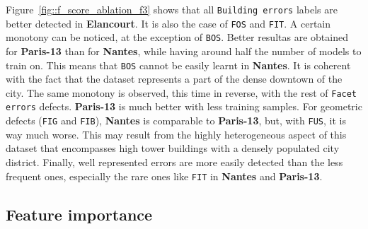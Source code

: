         Figure~\ref{fig::f_score_ablation_f3} shows that all \texttt{Building errors} labels are better detected in \textbf{Elancourt}.
        It is also the case of \texttt{FOS} and \texttt{FIT}.
        A certain monotony can be noticed, at the exception of \texttt{BOS}.
        Better resultas are obtained for \textbf{Paris-13} than for \textbf{Nantes}, while having around half the number of models to train on.
        This means that \texttt{BOS} cannot be easily learnt in \textbf{Nantes}.
        It is coherent with the fact that the dataset represents a part of the dense downtown of the city.
        The same monotony is observed, this time in reverse, with the rest of \texttt{Facet errors} defects. \textbf{Paris-13} is much better with less training samples.
        For geometric defects (\texttt{FIG} and \texttt{FIB}), \textbf{Nantes} is comparable to \textbf{Paris-13}, but, with \texttt{FUS}, it is way much worse.
        This may result from the highly heterogeneous aspect of this dataset that encompasses high tower buildings with a densely populated city district.
        Finally, well represented errors are more easily detected than the less frequent ones, especially the rare ones like \texttt{FIT} in \textbf{Nantes} and \textbf{Paris-13}.
        
    \subsection{Feature importance}
        \label{subsec::experiments::baseline_feature_analysis::feature_importance}
        \begin{figure}[htpb]
            \centering
        \end{figure}
        
